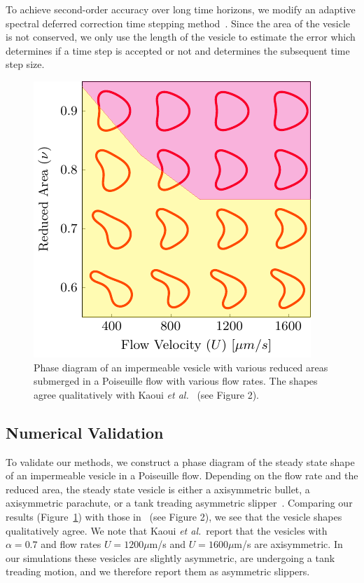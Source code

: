 \documentclass[9pt,twocolumn,twoside,lineno]{pnas-new}
\newif\ifTikz
\begin{document}
To achieve second-order accuracy over long time horizons, we modify an
adaptive spectral deferred correction time stepping
method~\cite{qua-bir2016}. Since the area of the vesicle is not
conserved, we only use the length of the vesicle to estimate the error
which determines if a time step is accepted or not and determines the
subsequent time step size.

\begin{figure}[htp]
  \centering
  \ifTikz
  
  \else
  \includegraphics{figures/parabolicImpermeable.pdf}
  \fi
  \caption{\label{fig:PoiseuillePhase} Phase diagram of an impermeable
  vesicle with various reduced areas submerged in a Poiseuille flow with
  various flow rates. The shapes agree qualitatively with Kaoui {\em et
  al.}~\cite{kao-bir-mis2009} (see Figure 2).}
\end{figure}

\subsection*{Numerical Validation}
To validate our methods, we construct a phase diagram of the steady
state shape of an impermeable vesicle in a Poiseuille flow. Depending on
the flow rate and the reduced area, the steady state vesicle is either a
axisymmetric bullet, a axisymmetric parachute, or a tank treading
asymmetric slipper~\cite{kao-bir-mis2009}. Comparing our results
(Figure~\ref{fig:PoiseuillePhase}) with those in~\cite{kao-bir-mis2009}
(see Figure 2), we see that the vesicle shapes qualitatively agree. We
note that Kaoui {\em et al.}~report that the vesicles with $\alpha=0.7$
and flow rates $U = 1200 \mu$m/s and $U = 1600 \mu$m/s are axisymmetric.
In our simulations these vesicles are slightly asymmetric, are
undergoing a tank treading motion, and we therefore report them as
asymmetric slippers.
\end{document}
